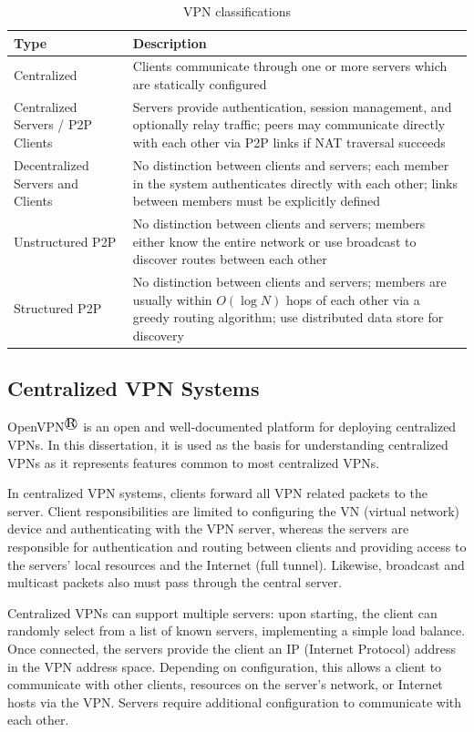 \begin{center}
\begin{table}
\caption{VPN classifications}
\label{tab:vpn_types}
\begin{tabular}{p{1.5in}p{4.5in}} \hline
Type & Description \\ \hline
Centralized & Clients communicate through one or more servers which are statically
configured \\
Centralized Servers / P2P Clients & Servers provide authentication, session management, and
optionally relay traffic; peers may communicate directly with each
other via P2P links if NAT traversal succeeds\\
Decentralized Servers and Clients & No distinction between clients and servers;
each member in the system authenticates directly with each other; links between
members must be explicitly defined \\
Unstructured P2P & No distinction between clients and servers; members either know
the entire network or use broadcast to discover routes between each other \\
Structured P2P & No distinction between clients and servers; members are usually
within $O(\log N)$ hops of each other via a greedy routing algorithm; use
distributed data store for discovery \\ \hline
\end{tabular}
\end{table}
\end{center}


\subsection{Centralized VPN Systems}

OpenVPN$^\registered$ is an open and well-documented platform for deploying centralized VPNs.
In this dissertation, it is used as the basis for understanding centralized
VPNs as it represents features common to most centralized VPNs.

In centralized VPN systems, clients forward all VPN related packets to the
server.  Client responsibilities are limited to configuring the VN (virtual
network) device and authenticating with the VPN server, whereas the servers are
responsible for authentication and routing between clients and providing access
to the servers' local resources and the Internet (full tunnel).  Likewise,
broadcast and multicast packets also must pass through the central server.

Centralized VPNs can support multiple servers: upon starting, the client can
randomly select from a list of known servers, implementing a simple load
balance.  Once connected, the servers provide the client an IP (Internet
Protocol) address in the VPN address space. Depending on configuration, this
allows a client to communicate with other clients, resources on the server's
network, or Internet hosts via the VPN.  Servers require additional
configuration to communicate with each other.

